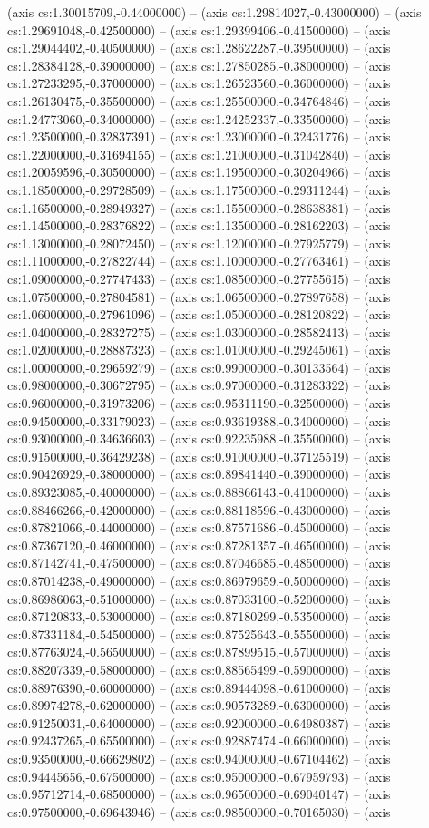 (axis cs:1.30015709,-0.44000000) -- (axis cs:1.29814027,-0.43000000) -- (axis cs:1.29691048,-0.42500000) -- (axis cs:1.29399406,-0.41500000) -- (axis cs:1.29044402,-0.40500000) -- (axis cs:1.28622287,-0.39500000) -- (axis cs:1.28384128,-0.39000000) -- (axis cs:1.27850285,-0.38000000) -- (axis cs:1.27233295,-0.37000000) -- (axis cs:1.26523560,-0.36000000) -- (axis cs:1.26130475,-0.35500000) -- (axis cs:1.25500000,-0.34764846) -- (axis cs:1.24773060,-0.34000000) -- (axis cs:1.24252337,-0.33500000) -- (axis cs:1.23500000,-0.32837391) -- (axis cs:1.23000000,-0.32431776) -- (axis cs:1.22000000,-0.31694155) -- (axis cs:1.21000000,-0.31042840) -- (axis cs:1.20059596,-0.30500000) -- (axis cs:1.19500000,-0.30204966) -- (axis cs:1.18500000,-0.29728509) -- (axis cs:1.17500000,-0.29311244) -- (axis cs:1.16500000,-0.28949327) -- (axis cs:1.15500000,-0.28638381) -- (axis cs:1.14500000,-0.28376822) -- (axis cs:1.13500000,-0.28162203) -- (axis cs:1.13000000,-0.28072450) -- (axis cs:1.12000000,-0.27925779) -- (axis cs:1.11000000,-0.27822744) -- (axis cs:1.10000000,-0.27763461) -- (axis cs:1.09000000,-0.27747433) -- (axis cs:1.08500000,-0.27755615) -- (axis cs:1.07500000,-0.27804581) -- (axis cs:1.06500000,-0.27897658) -- (axis cs:1.06000000,-0.27961096) -- (axis cs:1.05000000,-0.28120822) -- (axis cs:1.04000000,-0.28327275) -- (axis cs:1.03000000,-0.28582413) -- (axis cs:1.02000000,-0.28887323) -- (axis cs:1.01000000,-0.29245061) -- (axis cs:1.00000000,-0.29659279) -- (axis cs:0.99000000,-0.30133564) -- (axis cs:0.98000000,-0.30672795) -- (axis cs:0.97000000,-0.31283322) -- (axis cs:0.96000000,-0.31973206) -- (axis cs:0.95311190,-0.32500000) -- (axis cs:0.94500000,-0.33179023) -- (axis cs:0.93619388,-0.34000000) -- (axis cs:0.93000000,-0.34636603) -- (axis cs:0.92235988,-0.35500000) -- (axis cs:0.91500000,-0.36429238) -- (axis cs:0.91000000,-0.37125519) -- (axis cs:0.90426929,-0.38000000) -- (axis cs:0.89841440,-0.39000000) -- (axis cs:0.89323085,-0.40000000) -- (axis cs:0.88866143,-0.41000000) -- (axis cs:0.88466266,-0.42000000) -- (axis cs:0.88118596,-0.43000000) -- (axis cs:0.87821066,-0.44000000) -- (axis cs:0.87571686,-0.45000000) -- (axis cs:0.87367120,-0.46000000) -- (axis cs:0.87281357,-0.46500000) -- (axis cs:0.87142741,-0.47500000) -- (axis cs:0.87046685,-0.48500000) -- (axis cs:0.87014238,-0.49000000) -- (axis cs:0.86979659,-0.50000000) -- (axis cs:0.86986063,-0.51000000) -- (axis cs:0.87033100,-0.52000000) -- (axis cs:0.87120833,-0.53000000) -- (axis cs:0.87180299,-0.53500000) -- (axis cs:0.87331184,-0.54500000) -- (axis cs:0.87525643,-0.55500000) -- (axis cs:0.87763024,-0.56500000) -- (axis cs:0.87899515,-0.57000000) -- (axis cs:0.88207339,-0.58000000) -- (axis cs:0.88565499,-0.59000000) -- (axis cs:0.88976390,-0.60000000) -- (axis cs:0.89444098,-0.61000000) -- (axis cs:0.89974278,-0.62000000) -- (axis cs:0.90573289,-0.63000000) -- (axis cs:0.91250031,-0.64000000) -- (axis cs:0.92000000,-0.64980387) -- (axis cs:0.92437265,-0.65500000) -- (axis cs:0.92887474,-0.66000000) -- (axis cs:0.93500000,-0.66629802) -- (axis cs:0.94000000,-0.67104462) -- (axis cs:0.94445656,-0.67500000) -- (axis cs:0.95000000,-0.67959793) -- (axis cs:0.95712714,-0.68500000) -- (axis cs:0.96500000,-0.69040147) -- (axis cs:0.97500000,-0.69643946) -- (axis cs:0.98500000,-0.70165030) -- (axis 